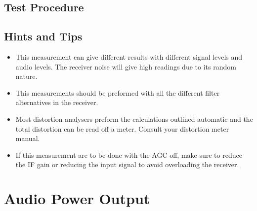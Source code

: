\documentclass[10pt,letterpaper]{book}
\begin{document}
\subsection*{Test Procedure}

\subsection*{Hints and Tips}
\begin{itemize}
	\item This measurement can give different results with different signal levels and audio levels. The receiver noise will give high readings due to its random nature. 
	\item This measurements should be preformed with all the different filter alternatives in the receiver. 
	\item Most distortion analysers preform the calculations outlined automatic and the total distortion can be read off a meter. Consult your distortion meter manual.
	\item If this measurement are to be done with the AGC off, make sure to reduce the IF gain or reducing the input signal to avoid overloading the receiver.
\end{itemize}

\newpage
\section{Audio Power Output}
\end{document}
